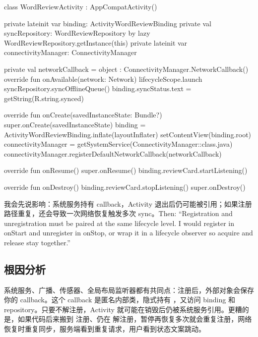 \begin{ktbug}
class WordReviewActivity : AppCompatActivity() {
    private lateinit var binding: ActivityWordReviewBinding
    private val syncRepository: WordReviewRepository by lazy { WordReviewRepository.getInstance(this) }
    private lateinit var connectivityManager: ConnectivityManager

    private val networkCallback = object : ConnectivityManager.NetworkCallback() {
        override fun onAvailable(network: Network) {
            lifecycleScope.launch {
                syncRepository.syncOfflineQueue()
                binding.syncStatus.text = getString(R.string.synced)
            }
        }
    }

    override fun onCreate(savedInstanceState: Bundle?) {
        super.onCreate(savedInstanceState)
        binding = ActivityWordReviewBinding.inflate(layoutInflater)
        setContentView(binding.root)
        connectivityManager = getSystemService(ConnectivityManager::class.java)
        connectivityManager.registerDefaultNetworkCallback(networkCallback)
    }

    override fun onResume() {
        super.onResume()
        binding.reviewCard.startListening()
    }

    override fun onDestroy() {
        binding.reviewCard.stopListening()
        super.onDestroy()
    }
}
\end{ktbug}

\begin{sayit}[面试里怎么说]
我会先说影响：系统服务持有 callback，Activity 退出后仍可能被引用；如果注册路径重复，还会导致一次网络恢复触发多次 sync。Then: ``Registration and unregistration must be paired at the same lifecycle level. I would register in onStart and unregister in onStop, or wrap it in a lifecycle observer so acquire and release stay together.''
\end{sayit}

\subsection*{根因分析}
系统服务、广播、传感器、全局布局监听器都有共同点：注册后，外部对象会保存你的 callback。这个 callback 是匿名内部类，隐式持有 ，又访问 binding 和 repository。只要不解注册，Activity 就可能在销毁后仍被系统服务引用。更糟的是，如果代码后来搬到  注册、仍在  解注册，暂停再恢复多次就会重复注册，网络恢复时重复同步，服务端看到重复请求，用户看到状态文案跳动。

